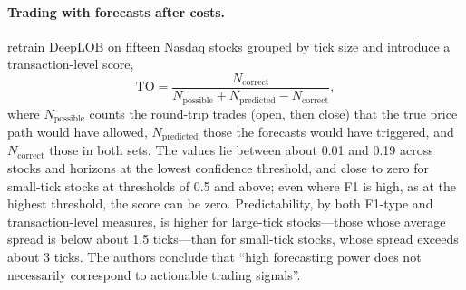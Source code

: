 \paragraph{Trading with forecasts after costs.} \citet{briola2024} retrain DeepLOB on fifteen Nasdaq stocks
grouped by tick size and introduce a transaction-level score,
\begin{equation}
  \mathrm{TO} = \frac{N_{\text{correct}}}{N_{\text{possible}} + N_{\text{predicted}} - N_{\text{correct}}},
\end{equation}
where $N_{\text{possible}}$ counts the round-trip trades (open, then close) that the true price path
would have allowed, $N_{\text{predicted}}$ those the forecasts would have triggered, and
$N_{\text{correct}}$ those in both sets.
 The values lie between about 0.01 and 0.19
across stocks and horizons at the lowest confidence threshold, and close to zero for small-tick stocks at
thresholds of 0.5 and above; even where F1 is high, as at the highest threshold, the score can be zero. Predictability, by both F1-type and transaction-level measures, is
higher for large-tick stocks---those whose average spread is below about 1.5 ticks---than for
small-tick stocks, whose spread exceeds about 3 ticks. The authors conclude that ``high forecasting
power does not necessarily correspond to actionable trading signals''.


